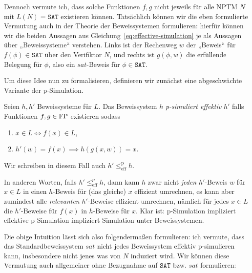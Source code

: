 Dennoch vermute ich, dass solche Funktionen $f,g$ nicht jeweils für alle NPTM $N$ mit $L(N)=\mathtt{SAT}$ existieren können.
Tatsächlich können wir die eben formulierte Vermutung auch in der Theorie der Beweissystemen formulieren: hierfür können wir die beiden Aussagen aus Gleichung~\ref{eq:effective-simulation} je als Aussagen über „Beweissysteme“ verstehen. Links ist der Rechenweg $w$ der „Beweis“ für $f(\phi)\in \mathtt{SAT}$ über den Verifiktor $N$, und rechts ist $g(\phi, w)$ die erfüllende Belegung für $\phi$, also ein $\mathit{sat}$-Beweis für $\phi\in\mathtt{SAT}$.

Um diese Idee nun zu formalisieren, definieren wir zunächst eine abgeschwächte Variante der p-Simulation.
\begin{definition}
    Seien $h,h'$ Beweissysteme für $L$. Das Beweissystem $h$ \emph{p-simuliert effektiv} $h'$ falls Funktionen $f,g\in\mathrm{FP}$ existieren sodass
    \begin{enumerate}
        \item $x\in L \iff f(x)\in L$,
        \item $ h'(w)=f(x) \implies h(g(x, w)) = x. $
    \end{enumerate}
    Wir schreiben in diesem Fall auch $h'\leq^\mathrm p_\mathrm{eff} h$. %
\end{definition}
In anderen Worten, falls $h'\leq^p_\mathrm{eff} h$, dann kann $h$ zwar nicht \emph{jeden} $h'$-Beweis $w$ für $x\in L$ in einen $h$-Beweis für (das gleiche) $x$ effizient umrechnen, es kann aber zumindest alle \emph{relevanten} $h'$-Beweise effizient umrechnen, nämlich für jedes $x\in L$ die $h'$-Beweise für $f(x)$ in $h$-Beweise für $x$.
Klar ist: p-Simulation impliziert effektive p-Simulation impliziert Simulation unter Beweissystemen.

Die obige Intuition lässt sich also folgendermaßen formulieren: ich vermute, dass das Standardbeweissystem $\mathit{sat}$ nicht jedes Beweissystem effektiv p-simulieren kann, insbesondere nicht jenes was von $N$ induziert wird.
Wir können diese Vermutung auch allgemeiner ohne Bezugnahme auf $\mathtt{SAT}$ bzw. $\mathit{sat}$ formulieren:

